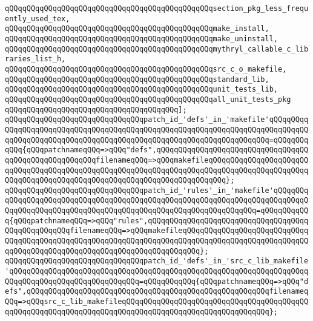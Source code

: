\verb|qQQqqQQqqQQqqQQqqQQqqQQqqQQqqQQqqQQqqQQqqQQqqQQqsection_pkg_less_frequently_used_tex,|\newline
\verb|qQQqqQQqqQQqqQQqqQQqqQQqqQQqqQQqqQQqqQQqqQQqqQQqmake_install,|\newline
\verb|qQQqqQQqqQQqqQQqqQQqqQQqqQQqqQQqqQQqqQQqqQQqqQQqmake_uninstall,|\newline
\verb|qQQqqQQqqQQqqQQqqQQqqQQqqQQqqQQqqQQqqQQqqQQqqQQqmythryl_callable_c_libraries_list_h,|\newline
\verb|qQQqqQQqqQQqqQQqqQQqqQQqqQQqqQQqqQQqqQQqqQQqqQQqsrc_c_o_makefile,|\newline
\verb|qQQqqQQqqQQqqQQqqQQqqQQqqQQqqQQqqQQqqQQqqQQqqQQqstandard_lib,|\newline
\verb|qQQqqQQqqQQqqQQqqQQqqQQqqQQqqQQqqQQqqQQqqQQqqQQqunit_tests_lib,|\newline
\verb|qQQqqQQqqQQqqQQqqQQqqQQqqQQqqQQqqQQqqQQqqQQqqQQqall_unit_tests_pkg|\newline
\verb|qQQqqQQqqQQqqQQqqQQqqQQqqQQqqQQqqQQqqQQq];|\newline
\newline
\verb|qQQqqQQqqQQqqQQqqQQqqQQqqQQqqQQqpatch_id_'defs'_in_'makefile'qQQqqQQqqQQqqQQqqQQqqQQqqQQqqQQqqQQqqQQqqQQqqQQqqQQqqQQqqQQqqQQqqQQqqQQqqQQqqQQqqQQqqQQqqQQqqQQqqQQqqQQqqQQqqQQqqQQqqQQqqQQqqQQqqQQqqQQqqQQq=qQQqqQQqqQQq{qQQqpatchnameqQQq=>qQQq"defs",qQQqqQQqqQQqqQQqqQQqqQQqqQQqqQQqqQQqqQQqqQQqqQQqqQQqqQQqfilenameqQQq=>qQQqmakefileqQQqqQQqqQQqqQQqqQQqqQQqqQQqqQQqqQQqqQQqqQQqqQQqqQQqqQQqqQQqqQQqqQQqqQQqqQQqqQQqqQQqqQQqqQQqqQQqqQQqqQQqqQQqqQQqqQQqqQQqqQQqqQQqqQQqqQQqqQQqqQQq};|\newline
\verb|qQQqqQQqqQQqqQQqqQQqqQQqqQQqqQQqpatch_id_'rules'_in_'makefile'qQQqqQQqqQQqqQQqqQQqqQQqqQQqqQQqqQQqqQQqqQQqqQQqqQQqqQQqqQQqqQQqqQQqqQQqqQQqqQQqqQQqqQQqqQQqqQQqqQQqqQQqqQQqqQQqqQQqqQQqqQQqqQQqqQQqqQQq=qQQqqQQqqQQq{qQQqpatchnameqQQq=>qQQq"rules",qQQqqQQqqQQqqQQqqQQqqQQqqQQqqQQqqQQqqQQqqQQqqQQqqQQqfilenameqQQq=>qQQqmakefileqQQqqQQqqQQqqQQqqQQqqQQqqQQqqQQqqQQqqQQqqQQqqQQqqQQqqQQqqQQqqQQqqQQqqQQqqQQqqQQqqQQqqQQqqQQqqQQqqQQqqQQqqQQqqQQqqQQqqQQqqQQqqQQqqQQqqQQqqQQqqQQq};|\newline
\newline
\verb|qQQqqQQqqQQqqQQqqQQqqQQqqQQqqQQqpatch_id_'defs'_in_'src_c_lib_makefile'qQQqqQQqqQQqqQQqqQQqqQQqqQQqqQQqqQQqqQQqqQQqqQQqqQQqqQQqqQQqqQQqqQQqqQQqqQQqqQQqqQQqqQQqqQQqqQQqqQQq=qQQqqQQqqQQq{qQQqpatchnameqQQq=>qQQq"defs",qQQqqQQqqQQqqQQqqQQqqQQqqQQqqQQqqQQqqQQqqQQqqQQqqQQqqQQqfilenameqQQq=>qQQqsrc_c_lib_makefileqQQqqQQqqQQqqQQqqQQqqQQqqQQqqQQqqQQqqQQqqQQqqQQqqQQqqQQqqQQqqQQqqQQqqQQqqQQqqQQqqQQqqQQqqQQqqQQqqQQqqQQq};|\newline
